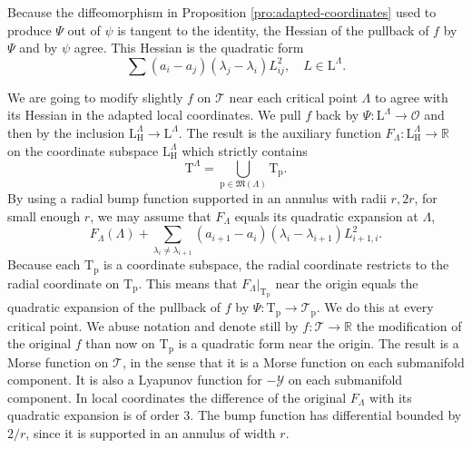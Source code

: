 \documentclass[reqno]{amsart}
\newcommand{\p}{\mathrm{p}}
\newcommand{\cO}{\mathcal{O}}
\newcommand{\cT}{\mathcal{T}}
\newcommand{\cY}{\mathcal{Y}}
\newcommand{\R}{\mathbb{R}}
\newcommand{\T}{\mathbb{T}}
\renewcommand{\L}{\mathrm{L}}
\renewcommand{\T}{\mathrm{T}}
\renewcommand{\H}{\mathrm{H}}
\begin{document}
Because the diffeomorphism in Proposition \ref{pro:adapted-coordinates} used to produce $\Psi$ out of $\psi$ is tangent to the identity, the Hessian of the pullback of $f$ by $\Psi$ and by $\psi$ agree.  This Hessian is the quadratic form
 \begin{equation}\label{eq:Hessian}\sum (a_i-a_j)(\lambda_j-\lambda_i)L_{ij}^2,\quad L\in \L^\Lambda.
  \end{equation}

We are going to modify slightly $f$ on $\cT$  near each critical point $\Lambda$ to agree  with its Hessian in  the adapted local coordinates. We pull  $f$ back by  $\Psi:\L^\Lambda\to \cO$ and then by the inclusion $\L^\Lambda_\H\to \L^\Lambda$. The result is the auxiliary function  $F_\Lambda:\L^\Lambda_\H\to \R$ on the coordinate subspace $\L^\Lambda_\H$ which strictly contains
\[\T^\Lambda=\bigcup_{\p\in \mathfrak{M}(\Lambda)}\T_{\p}.\]
By using a radial bump function supported in an annulus with radii $r,2r$, for small enough $r$,  we may assume that $F_\Lambda$ equals its quadratic expansion at $\Lambda$,
\begin{equation}\label{eq:Hessian2}
F_\Lambda(\Lambda)+\sum_{\lambda_i\neq \lambda_{i+1}} (a_{i+1}-a_i)(\lambda_{i}-\lambda_{i+1})L_{i+1,i}^2.
\end{equation}
Because each $\T_\p$ is a coordinate subspace, the radial coordinate restricts to the radial coordinate on  $\T_{\p}$.
This means that ${F_\Lambda}|_{\T_\p}$ near the origin equals the quadratic expansion of the pullback of $f$ by $\Psi:\T_\p\to \cT_\p$. We do this at every critical point. We abuse notation and denote still by $f:\cT\to \R$ the modification of the original $f$ than now on $\T_\p$ is a quadratic form near the origin. The result is a  Morse function on $\cT$, in the sense that it is a Morse function on each submanifold component. It is also a Lyapunov function for $-\cY$ on each submanifold component. In local coordinates the difference of the original $F_\Lambda$ with its quadratic expansion is of order 3. The bump function has differential bounded by $2/r$, since it is supported in an annulus of width $r$.

\end{document}
